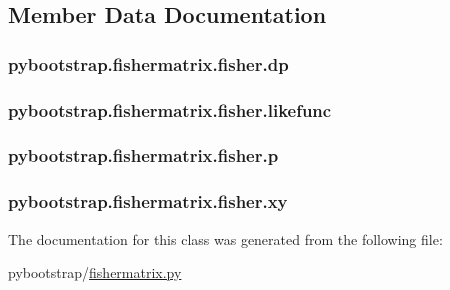 \subsection{Member Data Documentation}
\hypertarget{classpybootstrap_1_1fishermatrix_1_1fisher_a51c9e87984c9fd8c12e247e714f017e0}{
\subsubsection[{dp}]{\setlength{\rightskip}{0pt plus 5cm}pybootstrap.\-fishermatrix.\-fisher.\-dp}}\label{classpybootstrap_1_1fishermatrix_1_1fisher_a51c9e87984c9fd8c12e247e714f017e0}
\hypertarget{classpybootstrap_1_1fishermatrix_1_1fisher_ae6192d5485cad03c3c4ba265ad00eee7}{
\subsubsection[{likefunc}]{\setlength{\rightskip}{0pt plus 5cm}pybootstrap.\-fishermatrix.\-fisher.\-likefunc}}\label{classpybootstrap_1_1fishermatrix_1_1fisher_ae6192d5485cad03c3c4ba265ad00eee7}
\hypertarget{classpybootstrap_1_1fishermatrix_1_1fisher_a6b3597ba746723f9eb9ddaf857161ea1}{
\subsubsection[{p}]{\setlength{\rightskip}{0pt plus 5cm}pybootstrap.\-fishermatrix.\-fisher.\-p}}\label{classpybootstrap_1_1fishermatrix_1_1fisher_a6b3597ba746723f9eb9ddaf857161ea1}
\hypertarget{classpybootstrap_1_1fishermatrix_1_1fisher_a7d7695f180eebea3db76cdbad3ee32b5}{
\subsubsection[{xy}]{\setlength{\rightskip}{0pt plus 5cm}pybootstrap.\-fishermatrix.\-fisher.\-xy}}\label{classpybootstrap_1_1fishermatrix_1_1fisher_a7d7695f180eebea3db76cdbad3ee32b5}


The documentation for this class was generated from the following file\-:\begin{DoxyCompactItemize}
\item 
pybootstrap/\hyperlink{fishermatrix_8py}{fishermatrix.\-py}\end{DoxyCompactItemize}
